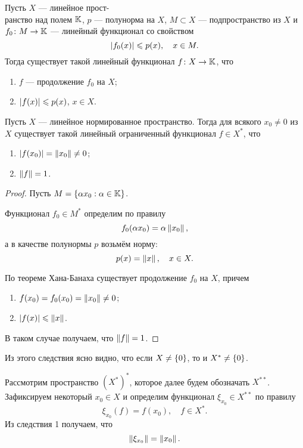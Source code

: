 \begin{theorem}
    Пусть $X$ --- линейное прост-\\ранство над полем $\mathbb{K}$, $p$ --- полунорма на $X$,
    $M \subset X$ --- подпространство из $X$ и $f_0 \colon M \to \mathbb{K}$ --- линейный
    функционал со свойством
    \[ \left|f_0(x)\right| \leqslant p(x), \quad x \in M. \]
    Тогда существует такой линейный функционал $f \colon X \to \mathbb{K}$, что
    \begin{enumerate}
        \item $f$ --- продолжение $f_0$ на $X$;
        \item $\left|f(x)\right| \leqslant p(x)$, $x \in X$.
    \end{enumerate}
\end{theorem}

\begin{corollaryth}
    Пусть $X$ --- линейное нормированное пространство. Тогда для всякого $x_0 \neq 0$ из $X$
    существует такой линейный ограниченный функционал $f \in X^*$, что
    \begin{enumerate}
        \item $\left|f(x_0)\right| = \left\|x_0\right\| \neq 0$;
        \item $\left\|f\right\| = 1$.
    \end{enumerate}
\end{corollaryth}

\begin{proof}
    Пусть $M = \left\{\alpha x_0 : \alpha \in \mathbb{K}\right\}$. 

    Функционал $f_0 \in M^*$ определим
    по правилу
    \[ f_0(\alpha x_0) = \alpha \left\|x_0\right\|, \]
    а в качестве полунормы $p$ возьмём норму:
    \[ p(x) = \left\|x\right\|, \quad x \in X. \]

    По теореме Хана-Банаха существует продолжение $f_0$ на $X$, причем
    \begin{enumerate}
        \item $f(x_0) = f_0(x_0) = \left\|x_0\right\| \neq 0$;
        \item $\left|f(x)\right| \leqslant \left\|x\right\|$.
    \end{enumerate}

    В таком случае получаем, что $\left\|f\right\| = 1$.
\end{proof}

Из этого следствия ясно видно, что если $X \neq \left\{0\right\}$, то и $X^* \neq \left\{0\right\}$.

Рассмотрим пространство $(X^*)^*$, которое далее будем обозначать $X^{**}$. 
Зафиксируем некоторый $x_0 \in X$ и определим функционал
$\xi_{x_0} \in X^{**}$ по правилу
\begin{equation}\label{eq:functional}
    \xi_{x_0}(f) = f(x_0), \quad f \in X^*.
\end{equation}
Из следствия 1 получаем, что
\[ \left\|\xi_{x_0}\right\| = \left\|x_0\right\|. \]

